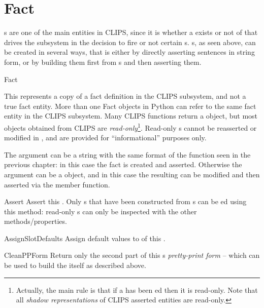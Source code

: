 \section{Fact\label{pyclips-cl-Fact}}

s are one of the main entities in CLIPS, since it is
whether a  exists or not of that drives the subsystem in
the decision to fire or not certain s. s, as
seen above, can be created in several ways, that is either by directly
asserting sentences in string form, or by building them first from
s and then asserting them.


\begin{classdesc*}{Fact}

This represents a copy of a fact definition in the CLIPS subsystem, and
not a true fact entity. More than one Fact objects in Python can refer to
the same fact entity in the CLIPS subsystem. Many CLIPS functions return
a  object, but most  objects obtained from CLIPS
are \emph{read-only}\footnote{Actually, the main rule is that if a
 has been ed then it is read-only. Note that
all \emph{shadow representations} of CLIPS asserted  entities
are read-only.}. Read-only s cannot be reasserted or modified
in , and are provided for ``informational'' purposes only.

The argument can be a string with the same format of the
 function seen in the previous chapter: in this case
the fact is created and asserted. Otherwise the argument can be a
 object, and in this case the resulting  can
be modified and then asserted via the  member
function.

\begin{methoddesc}{Assert}{}
Assert this . Only s that have been constructed
from s can be ed using this method:
read-only s can only be inspected with the other
methods/properties.
\end{methoddesc}

\begin{methoddesc}{AssignSlotDefaults}{}
Assign default values to  of this .
\end{methoddesc}

\begin{methoddesc}{CleanPPForm}{}
Return only the second part of this s \emph{pretty-print form}
-- which can be used to build the  itself as described above.
\end{methoddesc}


\end{classdesc*}
